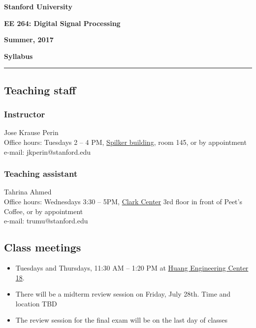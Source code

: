 \documentclass[10pt]{article}
\begin{document}
\doublespacing
\begin{center}
	\textbf{\large Stanford University}
	
	\textbf{\large EE 264: Digital Signal Processing}
	
	\textbf{\large Summer, 2017}
	
	\vspace{2mm}
	
	\textbf{\large Syllabus}
\end{center}
\vspace{-5mm}
\rule{\textwidth}{0.5pt}
\singlespacing

\subsection*{Teaching staff} 

\subsubsection*{Instructor} 
Jose Krause Perin \\
Office hours: Tuesdays 2 -- 4 PM, \href{https://campus-map.stanford.edu/?id=04-040&lat=37.42879024&lng=-122.1740029&zoom=17&srch=spilker}{Spilker building}, room 145, or by appointment \\
e-mail: jkperin@stanford.edu

\subsubsection*{Teaching assistant} Tahrina Ahmed \\
Office hours: Wednesdays 3:30 -- 5PM, \href{https://campus-map.stanford.edu/?id=07-340&lat=37.43134094&lng=-122.17436685&zoom=17&srch=clark}{Clark Center} 3rd floor in front of Peet's Coffee, or by appointment\\
e-mail: trumu@stanford.edu

\subsection*{Class meetings} 
\begin{itemize}
	\item Tuesdays and Thursdays, 11:30 AM -- 1:20 PM at \href{https://campus-map.stanford.edu/?srch=Huang+Engineering+Center+18}{Huang Engineering Center 18}.
	\item There will be a midterm review session on Friday, July 28th. Time and location TBD 
	\item The review session for the final exam will be on the last day of classes
\end{itemize}
\end{document}
